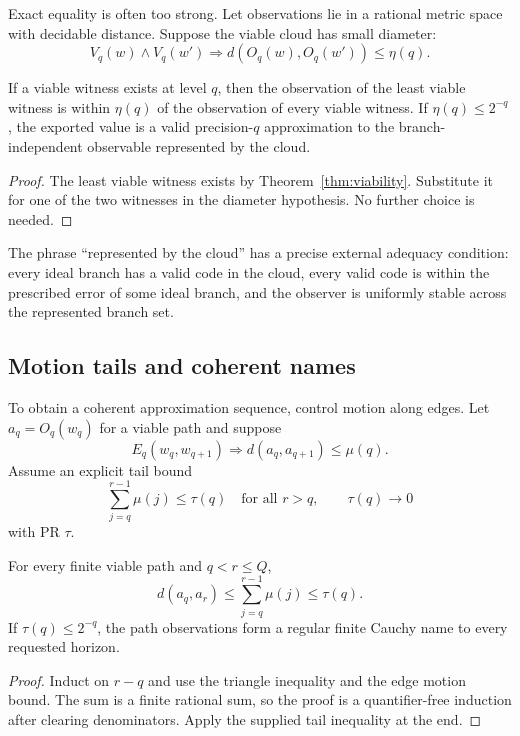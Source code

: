 Exact equality is often too strong.  Let observations lie in a rational metric
space with decidable distance.  Suppose the viable cloud has small diameter:
\[
   V_q(w)\wedge V_q(w')
       \Longrightarrow d(O_q(w),O_q(w'))\le\eta(q).
\]

\begin{theorem}\label{thm:approx-observer}
If a viable witness exists at level \(q\), then the observation of the least
viable witness is within \(\eta(q)\) of the observation of every viable witness.
If \(\eta(q)\le2^{-q}\), the exported value is a valid precision-\(q\)
approximation to the branch-independent observable represented by the cloud.
\end{theorem}

\begin{proof}
The least viable witness exists by Theorem~\ref{thm:viability}.  Substitute it
for one of the two witnesses in the diameter hypothesis.  No further choice is
needed.
\end{proof}

The phrase ``represented by the cloud'' has a precise external adequacy
condition: every ideal branch has a valid code in the cloud, every valid code is
within the prescribed error of some ideal branch, and the observer is uniformly
stable across the represented branch set.

\subsection{Motion tails and coherent names}

To obtain a coherent approximation sequence, control motion along edges.  Let
\(a_q=O_q(w_q)\) for a viable path and suppose
\[
       E_q(w_q,w_{q+1})
          \Longrightarrow d(a_q,a_{q+1})\le\mu(q).
\]
Assume an explicit tail bound
\[
       \sum_{j=q}^{r-1}\mu(j)\le\tau(q)
       \quad\text{for all }r>q,
       \qquad \tau(q)\to0
\]
with PR \(\tau\).

\begin{theorem}\label{thm:motion-tail}
For every finite viable path and \(q<r\le Q\),
\[
      d(a_q,a_r)\le\sum_{j=q}^{r-1}\mu(j)\le\tau(q).
\]
If \(\tau(q)\le2^{-q}\), the path observations form a regular finite Cauchy
name to every requested horizon.
\end{theorem}

\begin{proof}
Induct on \(r-q\) and use the triangle inequality and the edge motion bound.
The sum is a finite rational sum, so the proof is a quantifier-free induction
after clearing denominators.  Apply the supplied tail inequality at the end.
\end{proof}

